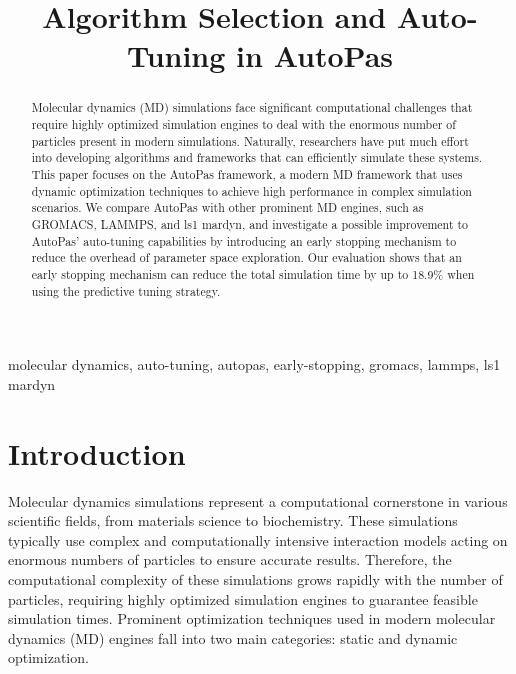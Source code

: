 \documentclass[conference]{IEEEtran}
\begin{document}
\title{Algorithm Selection and Auto-Tuning in AutoPas}

\author{
}

\maketitle

\begin{abstract}
    Molecular dynamics (MD) simulations face significant computational challenges that require highly optimized simulation engines to deal with the enormous number of particles present in modern simulations. Naturally, researchers have put much effort into developing algorithms and frameworks that can efficiently simulate these systems. This paper focuses on the AutoPas framework, a modern MD framework that uses dynamic optimization techniques to achieve high performance in complex simulation scenarios. We compare AutoPas with other prominent MD engines, such as GROMACS, LAMMPS, and ls1 mardyn, and investigate a possible improvement to AutoPas' auto-tuning capabilities by introducing an early stopping mechanism to reduce the overhead of parameter space exploration. Our evaluation shows that an early stopping mechanism can reduce the total simulation time by up to 18.9\% when using the predictive tuning strategy.
\end{abstract}

\begin{IEEEkeywords}
    molecular dynamics, auto-tuning, autopas, early-stopping, gromacs, lammps, ls1 mardyn
\end{IEEEkeywords}

\section{Introduction}

Molecular dynamics simulations represent a computational cornerstone in various scientific fields, from materials science to biochemistry. These simulations typically use complex and computationally intensive interaction models acting on enormous numbers of particles to ensure accurate results. Therefore, the computational complexity of these simulations grows rapidly with the number of particles, requiring highly optimized simulation engines to guarantee feasible simulation times. Prominent optimization techniques used in modern molecular dynamics (MD) engines fall into two main categories: static and dynamic optimization.
\end{document}
